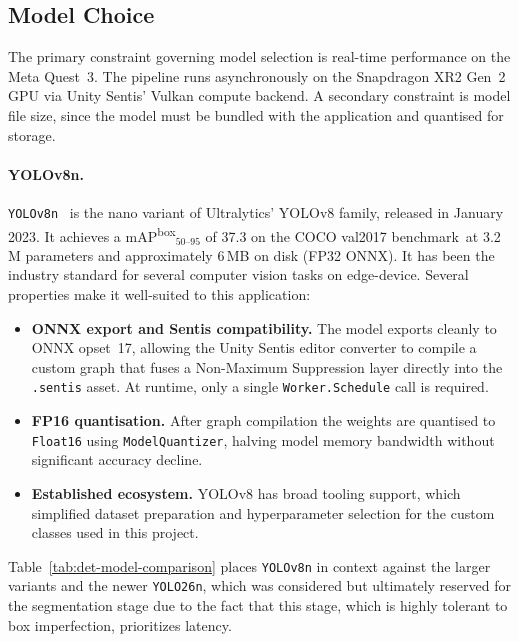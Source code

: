 \documentclass{article}
\begin{document}
\subsection{Model Choice}
\label{sec:det-model-choice}

The primary constraint governing model selection is real-time performance on the
Meta Quest~3. The pipeline runs asynchronously on the Snapdragon XR2 Gen~2 GPU via Unity Sentis'
Vulkan compute backend. A secondary constraint is model file size, since the model
must be bundled with the application and quantised for storage.

\paragraph{YOLOv8n.}
\texttt{YOLOv8n}~ is the nano variant of Ultralytics' YOLOv8 family,
released in January 2023. It achieves a mAP\textsuperscript{box}$_{50\text{--}95}$ of 37.3 on the COCO val2017 benchmark~at 3.2\,M parameters and
approximately 6\,MB on disk (FP32 ONNX). It has been the industry standard for several computer vision tasks on edge-device. Several properties make it well-suited to this application:

\begin{itemize}
    \item \textbf{ONNX export and Sentis compatibility.} The model exports cleanly to ONNX opset~17, allowing the Unity Sentis editor converter to compile a custom graph that fuses a Non-Maximum Suppression layer directly into the \texttt{.sentis} asset. At runtime, only a single \texttt{Worker.Schedule} call is required.

    \item \textbf{FP16 quantisation.} After graph compilation the weights are
    quantised to \texttt{Float16} using \texttt{ModelQuantizer}, halving model
    memory bandwidth without significant accuracy decline.

    \item \textbf{Established ecosystem.} YOLOv8 has broad tooling
    support, which simplified dataset preparation and hyperparameter selection for the custom classes used in this project.
\end{itemize}

\noindent Table~\ref{tab:det-model-comparison} places \texttt{YOLOv8n} in context
against the larger variants and the newer \texttt{YOLO26n}, which was considered but
ultimately reserved for the segmentation stage due to the fact that this stage, which is highly tolerant to box imperfection, prioritizes latency.
\end{document}
